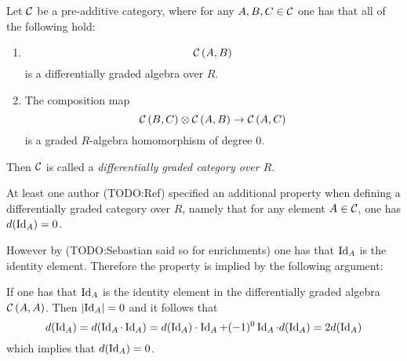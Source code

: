
\begin{definition}
    Let \( {\mathcal{C}} \) be a pre-additive category, where for any \( A, B, C \in {\mathcal{C}} \) one has that all of the following hold:
    \begin{enumerate}
        \item {
            \[
                {\mathcal{C}}\left( A, B \right)
            \]
            is a differentially graded algebra over \( R \).
        }
        \item {
            The composition map
            \[
                {\mathcal{C}}\left( B, C \right) \otimes {\mathcal{C}}\left( A, B \right)  \to {\mathcal{C}}\left( A, C \right)
            \]
            is a graded \( R \)-algebra homomorphism of degree \( 0 \).
        }
    \end{enumerate}
    Then \( {\mathcal{C}} \) is called a \emph{differentially graded category over \( R \)}.
\end{definition}

\begin{remark}
    At least one author (TODO:Ref) specified an additional property when defining a differentially graded category over \( R \), namely that for any element \( A \in {\mathcal{C}} \), one has \( d(\operatorname{Id}_A) = 0 \).

    However by (TODO:Sebastian said so for enrichments) one has that \( \operatorname{Id}_A \) is the identity element. Therefore the property is implied by the following argument:
    
    If one has that \( \operatorname{Id}_A \) is the identity element in the differentially graded algebra \( {\mathcal{C}}\left( A, A \right) \). Then \( \lvert \operatorname{Id}_A \rvert = 0 \) and it follows that
    \[
        d(\operatorname{Id}_A) = d(\operatorname{Id}_A \cdot \operatorname{Id}_A) = d(\operatorname{Id}_A) \cdot \operatorname{Id}_A + (-1)^0 \operatorname{Id}_A \cdot d(\operatorname{Id}_A) = 2d(\operatorname{Id}_A)
    \]
    which implies that \( d(\operatorname{Id}_A) = 0 \).
\end{remark}
